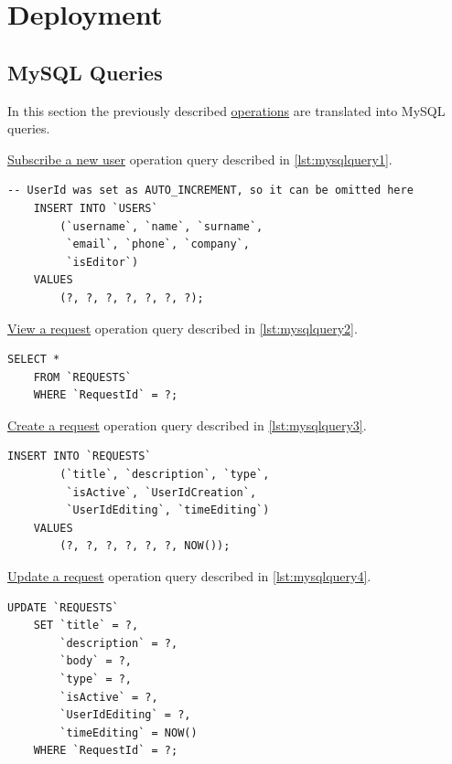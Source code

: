 \documentclass[12pt, a4paper]{report}
\begin{document}
\chapter*{Deployment}

\section*{MySQL Queries}

In this section the previously described \hyperref[subsec:ops]{operations} are translated into MySQL queries.

\hyperref[subsubsec:op1]{Subscribe a new user} operation query described in \autoref{lst:mysqlquery1}.

\begin{lstlisting}[language=MySQL, caption={\texorpdfstring{\hyperref[subsubsec:op1]{op. 1}}{op. 1}}, label={lst:mysqlquery1}]
    -- UserId was set as AUTO_INCREMENT, so it can be omitted here
    INSERT INTO `USERS`
        (`username`, `name`, `surname`,
         `email`, `phone`, `company`,
         `isEditor`)
    VALUES
        (?, ?, ?, ?, ?, ?, ?);
\end{lstlisting}

\hyperref[subsubsec:op2]{View a request} operation query described in \autoref{lst:mysqlquery2}.

\begin{lstlisting}[language=MySQL, caption={\texorpdfstring{\hyperref[subsubsec:op2]{op. 2}}{op. 2}}, label={lst:mysqlquery2}]
    SELECT *
    FROM `REQUESTS`
    WHERE `RequestId` = ?;
\end{lstlisting}

\hyperref[subsubsec:op3]{Create a request} operation query described in \autoref{lst:mysqlquery3}.

\begin{lstlisting}[language=MySQL, caption={\texorpdfstring{\hyperref[subsubsec:op3]{op. 3}}{op. 3}}, label={lst:mysqlquery3}]
    INSERT INTO `REQUESTS`
        (`title`, `description`, `type`,
         `isActive`, `UserIdCreation`,
         `UserIdEditing`, `timeEditing`)
    VALUES
        (?, ?, ?, ?, ?, ?, NOW());
\end{lstlisting}

\hyperref[subsubsec:op4]{Update a request} operation query described in \autoref{lst:mysqlquery4}.

\begin{lstlisting}[language=MySQL, caption={\texorpdfstring{\hyperref[subsubsec:op4]{op. 4}}{op. 4}}, label={lst:mysqlquery4}]
    UPDATE `REQUESTS`
    SET `title` = ?,
        `description` = ?,
        `body` = ?,
        `type` = ?,
        `isActive` = ?,
        `UserIdEditing` = ?,
        `timeEditing` = NOW()
    WHERE `RequestId` = ?;
\end{lstlisting}
\end{document}
